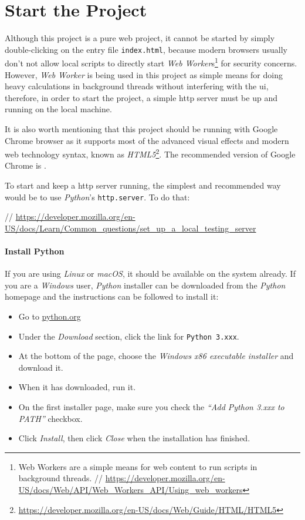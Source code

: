 
\section{Start the Project}

Although this project is a pure web project, it cannot be started by simply double-clicking on the entry file \texttt{index.html}, because modern browsers usually don't not allow local scripts to directly start \emph{Web Worker}s\footnote{ Web Workers are a simple means for web content to run scripts in background threads. // \url{https://developer.mozilla.org/en-US/docs/Web/API/Web_Workers_API/Using_web_workers}} for security concerns. However, \emph{Web Worker} is being used in this project as simple means for doing heavy calculations in background threads without interfering with the \gls{ui}, therefore, in order to start the project, a simple \gls{http} server must be up and running on the local machine.

It is also worth mentioning that this project should be running with Google Chrome browser as it supports most of the advanced visual effects and modern web technology syntax, known as \emph{HTML5}\footnote{ \url{https://developer.mozilla.org/en-US/docs/Web/Guide/HTML/HTML5}}. The recommended version of Google Chrome is .

To start and keep a \gls{http} server running, the simplest and recommended way would be to use \emph{Python}'s \texttt{http.server}. To do that:

// \url{https://developer.mozilla.org/en-US/docs/Learn/Common_questions/set_up_a_local_testing_server}

\paragraph{Install Python} If you are using \emph{Linux} or \emph{macOS}, it should be available on the system already. If you are a \emph{Windows} user, \emph{Python} installer can be downloaded from the \emph{Python} homepage and the instructions can be followed to install it:

\begin{itemize}
  \item Go to \url{python.org}
  \item Under the \emph{Download} section, click the link for \texttt{Python 3.xxx}.
  \item At the bottom of the page, choose the \emph{Windows x86 executable installer} and download it.
  \item When it has downloaded, run it.
  \item On the first installer page, make sure you check the \emph{``Add Python 3.xxx to PATH''} checkbox.
  \item Click \emph{Install}, then click \emph{Close} when the installation has finished.
\end{itemize}

